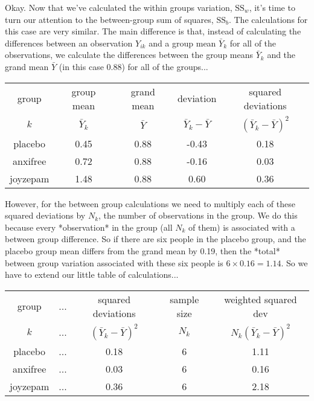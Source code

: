 Okay. Now that we've calculated the within groups variation, $\mbox{SS}_w$, it's time to turn our attention to the between-group sum of squares, $\mbox{SS}_b$. The calculations for this case are very similar. The main difference is that, instead of calculating the differences between an observation $Y_{ik}$ and a group mean $\bar{Y}_k$ for all of the observations, we calculate the differences between the group means $\bar{Y}_k$ and the grand mean $\bar{Y}$ (in this case 0.88) for all of the groups...

\small
\vspace*{6pt}
\begin{tabular}{c|c|c|c|c}
 group & group mean  & grand mean & deviation               & squared deviations \\  
  $k$  & $\bar{Y}_k$ & $\bar{Y}$  & $\bar{Y}_{k} - \bar{Y}$ & $(\bar{Y}_{k} - \bar{Y})^2$ \\  \hline
placebo   & 0.45  &  0.88 &  -0.43 &  0.18 \\
anxifree  & 0.72  &  0.88 &  -0.16 &  0.03 \\
joyzepam  & 1.48  &  0.88 &  0.60  &  0.36 \\
\end{tabular}
\vspace*{6pt}
\normalsize


However, for the between group calculations we need to multiply each of these squared deviations by $N_k$, the number of observations in the group. We do this because every *observation* in the group (all $N_k$ of them) is associated with a between group difference. So if there are six people in the placebo group, and the placebo group mean differs from the grand mean by 0.19, then the *total* between group variation associated with these six people is $6 \times 0.16 = 1.14$. So we have to extend our little table of calculations...

\small
\vspace*{6pt}
\begin{tabular}{c|c |c|c|c}
 group & \hspace{.25cm}...\hspace{.25cm} & squared deviations & sample size & weighted squared dev\\  
  $k$  & ... & $(\bar{Y}_{k} - \bar{Y})^2$ & $N_k$ & $N_k (\bar{Y}_{k} - \bar{Y})^2$\\  \hline
placebo   & ... &  0.18 & 6 & 1.11\\
anxifree  & ... &  0.03 & 6 & 0.16\\
joyzepam  & ... &  0.36 & 6 & 2.18\\
\end{tabular}
\vspace*{6pt}
\normalsize



